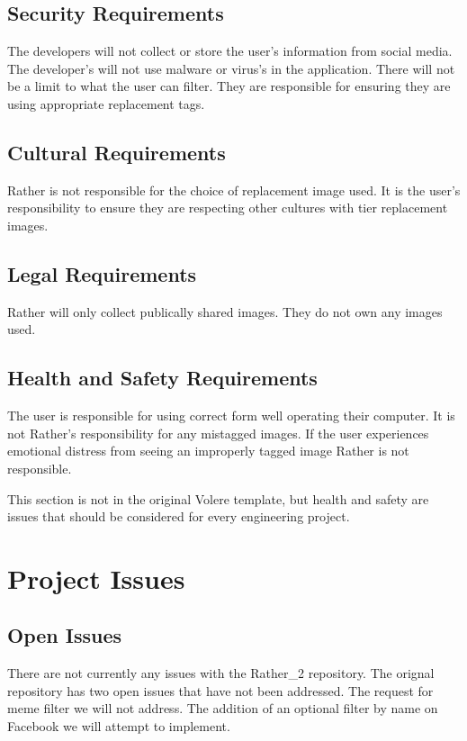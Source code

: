 \documentclass[12pt, titlepage]{article}
\begin{document}
\subsection{Security Requirements}
The developers will not collect or store the user's information from social media. The developer's will not use malware or virus's in the application. There will not be a limit to what the user can filter. They are responsible for ensuring they are using appropriate replacement tags. 

\subsection{Cultural Requirements}
Rather is not responsible for the choice of replacement image used. It is the user's responsibility to ensure they are respecting other cultures with tier replacement images.

\subsection{Legal Requirements}
Rather will only collect publically shared images. They do not own any images used. 

\subsection{Health and Safety Requirements}
The user is responsible for using correct form well operating their computer. It is not Rather's responsibility for any mistagged images. If the user experiences emotional distress from seeing an improperly tagged image Rather is not responsible. 

This section is not in the original Volere template, but health and safety are
issues that should be considered for every engineering project.

\section{Project Issues}

\subsection{Open Issues}
There are not currently any issues with the Rather_2 repository. The orignal repository has two open issues that have not been addressed. The request for meme filter we will not address. The addition of an optional filter by name on Facebook we will attempt to implement. 
\end{document}
